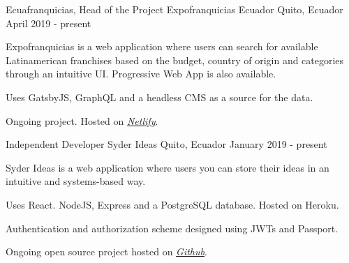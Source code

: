 \begin{cventries}
  \cventry
    {Ecuafranquicias, Head of the Project}
    {Expofranquicias Ecuador}
    {Quito, Ecuador}
    {April 2019 - present}
    {
      \begin{cvitems}
        \item {Expofranquicias is a web application where users can search for available Latinamerican franchises based on the budget, country of origin and categories through an intuitive UI. Progressive Web App is also available.}
        \item {Uses GatsbyJS, GraphQL and a headless CMS as a source for the data. }
        \item {Ongoing project. Hosted on \href{https://expofranquiciasecuador.com/franquicias-disponibles}{\textit{Netlify}}.}
      \end{cvitems}
    }

  \cventry
    {Independent Developer}
    {Syder Ideas}
    {Quito, Ecuador}
    {January 2019 - present}
    {
      \begin{cvitems}
        \item {Syder Ideas is a web application where users you can store their ideas in an intuitive and systems-based way.}
        \item {Uses React. NodeJS, Express and a PostgreSQL database. Hosted on Heroku.}
        \item {Authentication and authorization scheme designed using JWTs and Passport.}
        \item {Ongoing open source project hosted on \href{https://github.com/guidosantillan01/syder-ideas}{\textit{Github}}.}
      \end{cvitems}
    }
\end{cventries}
